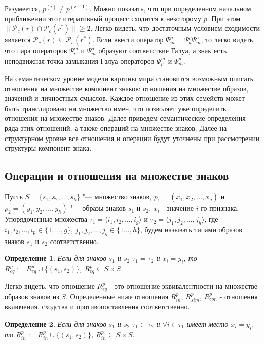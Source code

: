 \documentclass[12pt]{scrartcl}
\newtheorem{definition}{Определение}
\begin{document}
	Разумеется, $p^{(i)}\not = p^{(i+1)}$. Можно показать, что при определенном начальном приближении этот итеративный процесс сходится к некоторому $p$. При этом $\|\mathcal P_c(r)\cap\mathcal P_c(r^*)\|\geq 2$. Легко видеть, что достаточным условием сходимости является $\mathcal P_c(r)\subseteq\mathcal P_c(r^*)$. Если ввести оператор $\Psi_m^p=\Psi_a^p\Psi_m^a$, то легко видеть, что пара операторов $\Psi_p^m$ и $\Psi_m^p$ образуют соответствие Галуа, а знак есть неподвижная точка замыкания Галуа операторов $\Psi_p^m$ и $\Psi_m^p$.
	
	На семантическом уровне модели картины мира становится возможным описать отношения на множестве компонент знаков: отношения на множестве образов, значений и личностных смыслов. Каждое отношение из этих семейств может быть транслировано на множество имен, что позволяет уже определить отношения на множестве знаков. Далее приведем семантические определения ряда этих отношений, а также операций на множестве знаков. Далее на структурном уровне все отношения и операции будут уточнены при рассмотрении структуры компонент знака.
		
	\subsection{Операции и отношения на множестве знаков}
	Пусть $S=\{s_1,s_2,\dots,s_k\}$ "--- множество знаков, $p_1=(x_1,x_2,\dots,x_g)$ и $p_2=(y_1,y_2,\dots,y_h)$ "--- образы знаков $s_1$ и $s_2$, $x_i$ - значение $i$-го признака. Упорядоченные множества $\tau_1=\langle i_1,i_2,\dots,i_g\rangle$ и $\tau_2=\langle j_1,j_2,\dots,j_h\rangle$, где $i_1,i_2,\dots,i_p\in\{1,\dots,g\}$, $j_1,j_2,\dots,j_q\in\{1\dots,h\}$, будем называть типами образов знаков $s_1$ и $s_2$ соответственно.
		
	\begin{definition}
		Если для знаков $s_1$ и $s_2$ $\tau_1=\tau_2$ и $x_i=y_i$, то $R^p_{eq}:=R^p_{eq}\cup\{(s_1,s_2)\}$, $R^p_{eq}\subseteq S\times S$.
	\end{definition}

	Легко видеть, что отношение $R^p_{eq}$ - это отношение эквивалентности на множестве образов знаков из $S$. Определенные ниже отношения $R^p_{in}$, $R^p_{sim}$, $R^p_{con}$ - отношения включения, сходства и противопоставления соответственно.

	\begin{definition}
		 Если для знаков $s_1$ и $s_2$ $\tau_1\subset\tau_2$ и $\forall i\in\tau_1$ имеет место $x_i=y_i$, то $R^p_{in}:=R^p_{in}\cup\{(s_1,s_2)\}$, $R^p_{in}\subseteq S\times S$.
	\end{definition}
	
\end{document}
